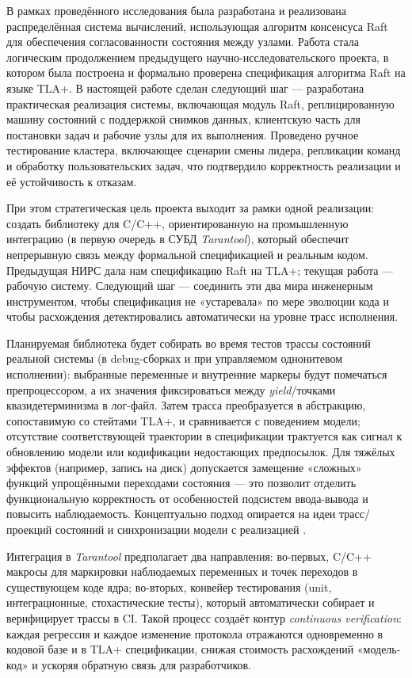 \conclusion

В рамках проведённого исследования была разработана и реализована
распределённая система вычислений, использующая алгоритм консенсуса Raft для
обеспечения согласованности состояния между узлами. Работа стала логическим
продолжением предыдущего научно-исследовательского проекта, в котором была
построена и формально проверена спецификация алгоритма Raft на языке TLA+. В
настоящей работе сделан следующий шаг — разработана практическая реализация
системы, включающая модуль Raft, реплицированную машину состояний с поддержкой
снимков данных, клиентскую часть для постановки задач и рабочие узлы для их выполнения.
Проведено ручное тестирование кластера, включающее сценарии смены лидера,
репликации команд и обработку пользовательских задач, что подтвердило
корректность реализации и её устойчивость к отказам.

При этом стратегическая цель проекта выходит за рамки одной реализации: создать
библиотеку для C/C++, ориентированную на промышленную интеграцию (в первую
очередь в СУБД \textit{Tarantool}), который обеспечит непрерывную связь между
формальной спецификацией и реальным кодом. Предыдущая НИРС дала нам
спецификацию Raft на TLA+; текущая работа — рабочую систему. Следующий шаг —
соединить эти два мира инженерным инструментом, чтобы спецификация не
«устаревала» по мере эволюции кода и чтобы расхождения детектировались
автоматически на уровне трасс исполнения.

Планируемая библиотека будет собирать во время тестов трассы состояний реальной
системы (в debug-сборках и при управляемом однонитевом исполнении): выбранные
переменные и внутренние маркеры будут помечаться препроцессором, а их значения
фиксироваться между \emph{yield}/точками квазидетерминизма в лог-файл. Затем
трасса преобразуется в абстракцию, сопоставимую со стейтами TLA+, и
сравнивается с поведением модели; отсутствие соответствующей траектории в
спецификации трактуется как сигнал к обновлению модели или кодификации
недостающих предпосылок. Для тяжёлых эффектов (например, запись на диск)
допускается замещение «сложных» функций упрощёнными переходами состояния — это
позволит отделить функциональную корректность от особенностей подсистем
ввода-вывода и повысить наблюдаемость. Концептуально подход опирается на идеи
трасс/проекций состояний и синхронизации модели с реализацией
\cite{trace_pn,tlacoverage,merz2024}.

Интеграция в \textit{Tarantool} предполагает два направления: во-первых,
C/C++ макросы для маркировки наблюдаемых переменных
и точек переходов в существующем коде ядра; во-вторых, конвейер тестирования
(unit, интеграционные, стохастические тесты), который автоматически собирает и
верифицирует трассы в CI. Такой процесс создаёт контур \emph{continuous
verification}: каждая регрессия и каждое изменение протокола отражаются
одновременно в кодовой базе и в TLA+ спецификации, снижая стоимость расхождений
«модель-код» и ускоряя обратную связь для разработчиков.

